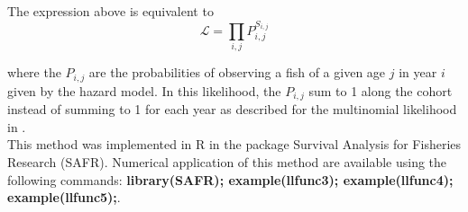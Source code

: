The expression above is equivalent to
\begin{equation}
\mathcal{L} = \prod_{i,j} P_{i,j} ^ {S_{i,j}}
\end{equation}

\noindent where the $P_{i,j}$ are the probabilities of observing a fish of a given age $j$ in year $i$ given by the hazard model. In this likelihood, the $P_{i,j}$ sum to 1 along the cohort instead of summing to 1 for each year as described for the multinomial likelihood in \cite{Four82a}. \\

This method was implemented in R \citep{R} in the package Survival Analysis for Fisheries Research (SAFR). Numerical application of this method are available using the following commands: {\bf library(SAFR); example(llfunc3); example(llfunc4); example(llfunc5);}.\\
